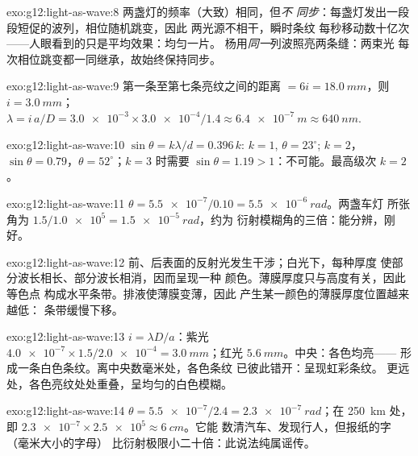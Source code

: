 \begin{solution}{exo:g12:light-as-wave:8}
两盏灯的频率（大致）相同，但\emph{不
同步}：每盏灯发出一段段短促的波列，相位随机跳变，因此
两光源不相干，瞬时条纹
每秒移动数十亿次——人眼看到的只是平均效果：均匀一片。
杨用\emph{同一}列波照亮两条缝：两束光
每次相位跳变都一同继承，故始终保持同步。
\end{solution}

\begin{solution}{exo:g12:light-as-wave:9}
第一条至第七条亮纹之间的距离 $= 6i = \qty{18.0}{mm}$，则 $i = \qty{3.0}{mm}$；
$\lambda = i\,a/D = \num{3.0e-3} \times \num{3.0e-4}/1.4 \approx
\qty{6.4e-7}{m} \approx \qty{640}{nm}$.
\end{solution}

\begin{solution}{exo:g12:light-as-wave:10}
$\sin\theta = k\lambda/d = 0.396\,k$: $k = 1$, $\theta = 23^\circ$;
$k = 2$，$\sin\theta = 0.79$，$\theta = 52^\circ$；$k = 3$ 时需要
$\sin\theta = 1.19 > 1$：不可能。最高级次 $k = 2$。
\end{solution}

\begin{solution}{exo:g12:light-as-wave:11}
$\theta = \num{5.5e-7}/0.10 = \qty{5.5e-6}{rad}$。两盏车灯
所张角为 $1.5/\num{1.0e5} = \qty{1.5e-5}{rad}$，约为
衍射模糊角的三倍：能分辨，刚好。
\end{solution}

\begin{solution}{exo:g12:light-as-wave:12}
前、后表面的反射光发生干涉；白光下，每种厚度
使部分波长相长、部分波长相消，因而呈现一种
颜色。薄膜厚度只与高度有关，因此等色点
构成水平条带。排液使薄膜变薄，因此
产生某一颜色的薄膜厚度位置越来越低：
条带缓慢下移。
\end{solution}

\begin{solution}{exo:g12:light-as-wave:13}
$i = \lambda D/a$：紫光 $\num{4.0e-7} \times 1.5/\num{2.0e-4} =
\qty{3.0}{mm}$；红光 $\qty{5.6}{mm}$。中央：各色均亮——
形成一条白色条纹。离中央数毫米处，各色条纹
已彼此错开：呈现虹彩条纹。
更远处，各色亮纹处处重叠，呈均匀的白色模糊。
\end{solution}

\begin{solution}{exo:g12:light-as-wave:14}
$\theta = \num{5.5e-7}/2.4 = \qty{2.3e-7}{rad}$；在 \qty{250}{km}
处，即 $\num{2.3e-7} \times \num{2.5e5} \approx \qty{6}{cm}$。它能
数清汽车、发现行人，但报纸的字（毫米大小的字母）
比衍射极限小二十倍：此说法纯属谣传。
\end{solution}

